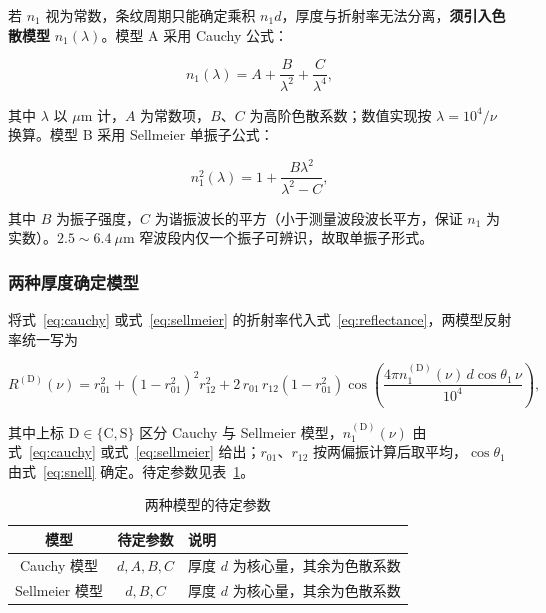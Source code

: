 \documentclass[withoutpreface,bwprint]{cumcmthesis}
\begin{document}
若 $n_1$ 视为常数，条纹周期只能确定乘积 $n_1d$，厚度与折射率无法分离，\textbf{须引入色散模型} $n_1(\lambda)$。模型 A 采用 Cauchy 公式：

\begin{equation}
n_1(\lambda) = A + \frac{B}{\lambda^2} + \frac{C}{\lambda^4},
\label{eq:cauchy}
\end{equation}

其中 $\lambda$ 以 $\mu$m 计，$A$ 为常数项，$B$、$C$ 为高阶色散系数；数值实现按 $\lambda=10^{4}/\nu$ 换算。模型 B 采用 Sellmeier 单振子公式：

\begin{equation}
n_1^{2}(\lambda) = 1 + \frac{B\lambda^{2}}{\lambda^{2} - C},
\label{eq:sellmeier}
\end{equation}

其中 $B$ 为振子强度，$C$ 为谐振波长的平方（小于测量波段波长平方，保证 $n_1$ 为实数）。$2.5\sim6.4\ \mu$m 窄波段内仅一个振子可辨识，故取单振子形式。

\subsubsection{两种厚度确定模型}

将式~\eqref{eq:cauchy} 或式~\eqref{eq:sellmeier} 的折射率代入式~\eqref{eq:reflectance}，两模型反射率统一写为

\begin{equation}
R^{(\mathrm{D})}(\nu) = r_{01}^{2} + \left(1-r_{01}^{2}\right)^{2} r_{12}^{2}
             + 2\,r_{01}\,r_{12}\left(1-r_{01}^{2}\right)
               \cos\left(\frac{4\pi n_1^{(\mathrm{D})}(\nu)\,d\cos\theta_1\,\nu}{10^{4}}\right),
\label{eq:model}
\end{equation}

其中上标 $\mathrm{D}\in\{\mathrm{C},\mathrm{S}\}$ 区分 Cauchy 与 Sellmeier 模型，$n_1^{(\mathrm{D})}(\nu)$ 由式~\eqref{eq:cauchy} 或式~\eqref{eq:sellmeier} 给出；$r_{01}$、$r_{12}$ 按两偏振计算后取平均，$\cos\theta_1$ 由式~\eqref{eq:snell} 确定。待定参数见表~\ref{tab:q1-params}。

\begin{table}[H]
    \centering
    \caption{两种模型的待定参数}
    \label{tab:q1-params}
    \begin{tabularx}{\textwidth}{c c >{\centering\arraybackslash}X}
        \toprule
        模型 & 待定参数 & 说明 \\
        \midrule
        Cauchy 模型 & $d, A, B, C$ & 厚度 $d$ 为核心量，其余为色散系数 \\
        Sellmeier 模型 & $d, B, C$ & 厚度 $d$ 为核心量，其余为色散系数 \\
        \bottomrule
    \end{tabularx}
\end{table}
\end{document}
